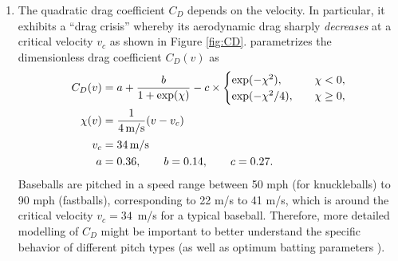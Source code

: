 \documentclass[letterpaper]{scrartcl}
\begin{document}
\begin{enumerate}
\item The quadratic drag coefficient $C_{D}$ depends on the
  velocity. In particular, it exhibits a ``drag crisis'' whereby its
  aerodynamic drag sharply \emph{decreases} at a critical velocity
  $v_{c}$ \citep{Frohlich:1984aa} as shown in Figure
  \ref{fig:CD}. \citet{Wang:2015aa} parametrizes the dimensionless
  drag coefficient $C_{D}(v)$ as
  \begin{align}
    \label{eq:CDv}
    C_{D}(v) &= a + \frac{b}{1 + \exp(\chi)} - c \times 
            \begin{cases}
              \exp(-\chi^{2}),   &\quad \chi < 0,\\
              \exp(-\chi^{2}/4), &\quad \chi \ge 0,\\
            \end{cases}\\
    \chi(v) &= \frac{1}{4\,\text{m/s}}(v - v_{c}) \notag\\
    v_{c} &= 34\,\text{m/s} \notag\\
    a &= 0.36, \qquad b = 0.14, \qquad c = 0.27. \notag        
  \end{align}
  Baseballs are pitched in a speed range between 50 mph (for
  knuckleballs) to 90 mph (fastballs), corresponding to 22 m/s to 41
  m/s, which is around the critical velocity $v_{c} = 34$~m/s for a
  typical baseball. Therefore, more detailed modelling of $C_{D}$
  might be important to better understand the specific behavior of
  different pitch types \citep{Frohlich:1984aa} (as well as optimum
  batting parameters \citep{Sawicki:2003aa}).


\end{enumerate}
\end{document}
